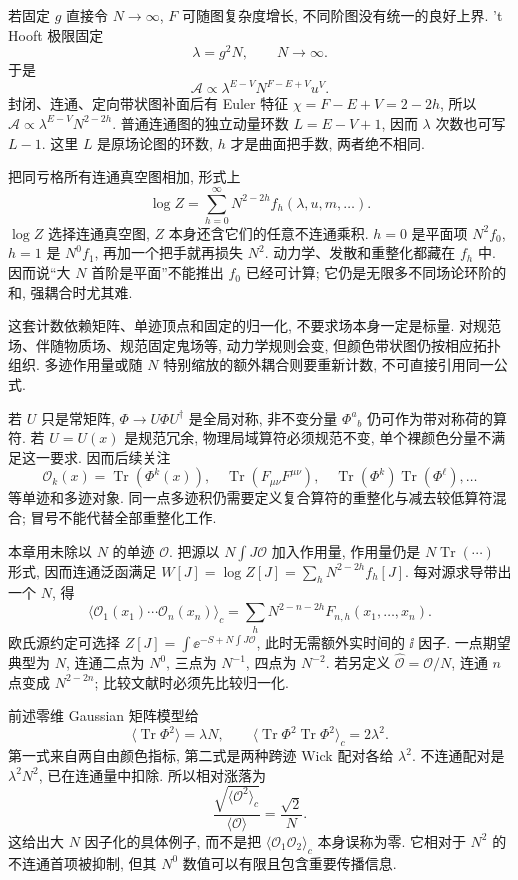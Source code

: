 若固定 $g$ 直接令 $N\to\infty$, $F$ 可随图复杂度增长, 不同阶图没有统一的良好上界. 't Hooft 极限固定
\[
\lambda=g^2N,\qquad N\to\infty.
\]
于是
\[
\mathcal A\propto\lambda^{E-V}N^{F-E+V}u^V.
\]
封闭、连通、定向带状图补面后有 Euler 特征 $\chi=F-E+V=2-2h$, 所以 $\mathcal A\propto\lambda^{E-V}N^{2-2h}$. 普通连通图的独立动量环数 $L=E-V+1$, 因而 $\lambda$ 次数也可写 $L-1$. 这里 $L$ 是原场论图的环数, $h$ 才是曲面把手数, 两者绝不相同.

把同亏格所有连通真空图相加, 形式上
\[
\log Z=\sum_{h=0}^\infty N^{2-2h}f_h(\lambda,u,m,\ldots).
\]
$\log Z$ 选择连通真空图, $Z$ 本身还含它们的任意不连通乘积. $h=0$ 是平面项 $N^2f_0$, $h=1$ 是 $N^0f_1$, 再加一个把手就再损失 $N^2$. 动力学、发散和重整化都藏在 $f_h$ 中. 因而说“大 $N$ 首阶是平面”不能推出 $f_0$ 已经可计算; 它仍是无限多不同场论环阶的和, 强耦合时尤其难.

这套计数依赖矩阵、单迹顶点和固定的归一化, 不要求场本身一定是标量. 对规范场、伴随物质场、规范固定鬼场等, 动力学规则会变, 但颜色带状图仍按相应拓扑组织. 多迹作用量或随 $N$ 特别缩放的额外耦合则要重新计数, 不可直接引用同一公式.

若 $U$ 只是常矩阵, $\Phi\to U\Phi U^\dagger$ 是全局对称, 非不变分量 $\Phi^a{}_b$ 仍可作为带对称荷的算符. 若 $U=U(x)$ 是规范冗余, 物理局域算符必须规范不变, 单个裸颜色分量不满足这一要求. 因而后续关注
\[
\mathcal O_k(x)=\operatorname{Tr}(\Phi^k(x)),\quad
\operatorname{Tr}(F_{\mu\nu}F^{\mu\nu}),\quad
\operatorname{Tr}(\Phi^k)\operatorname{Tr}(\Phi^\ell),\ldots
\]
等单迹和多迹对象. 同一点多迹积仍需要定义复合算符的重整化与减去较低算符混合; 冒号不能代替全部重整化工作.

本章用未除以 $N$ 的单迹 $\mathcal O$. 把源以 $N\int J\mathcal O$ 加入作用量, 作用量仍是 $N\operatorname{Tr}(\cdots)$ 形式, 因而连通泛函满足 $W[J]=\log Z[J]=\sum_hN^{2-2h}f_h[J]$. 每对源求导带出一个 $N$, 得
\[
\langle\mathcal O_1(x_1)\cdots\mathcal O_n(x_n)\rangle_c
=\sum_hN^{2-n-2h}F_{n,h}(x_1,\ldots,x_n).
\]
欧氏源约定可选择 $Z[J]=\int\ee^{-S+N\int J\mathcal O}$, 此时无需额外实时间的 $\ii$ 因子. 一点期望典型为 $N$, 连通二点为 $N^0$, 三点为 $N^{-1}$, 四点为 $N^{-2}$. 若另定义 $\widehat{\mathcal O}=\mathcal O/N$, 连通 $n$ 点变成 $N^{2-2n}$; 比较文献时必须先比较归一化.

前述零维 Gaussian 矩阵模型给
\[
\langle\operatorname{Tr}\Phi^2\rangle=\lambda N,
\qquad
\langle\operatorname{Tr}\Phi^2\operatorname{Tr}\Phi^2\rangle_c
=2\lambda^2.
\]
第一式来自两自由颜色指标, 第二式是两种跨迹 Wick 配对各给 $\lambda^2$. 不连通配对是 $\lambda^2N^2$, 已在连通量中扣除. 所以相对涨落为
\[
\frac{\sqrt{\langle\mathcal O^2\rangle_c}}
{\langle\mathcal O\rangle}=\frac{\sqrt2}{N}.
\]
这给出大 $N$ 因子化的具体例子, 而不是把 $\langle\mathcal O_1\mathcal O_2\rangle_c$ 本身误称为零. 它相对于 $N^2$ 的不连通首项被抑制, 但其 $N^0$ 数值可以有限且包含重要传播信息.


